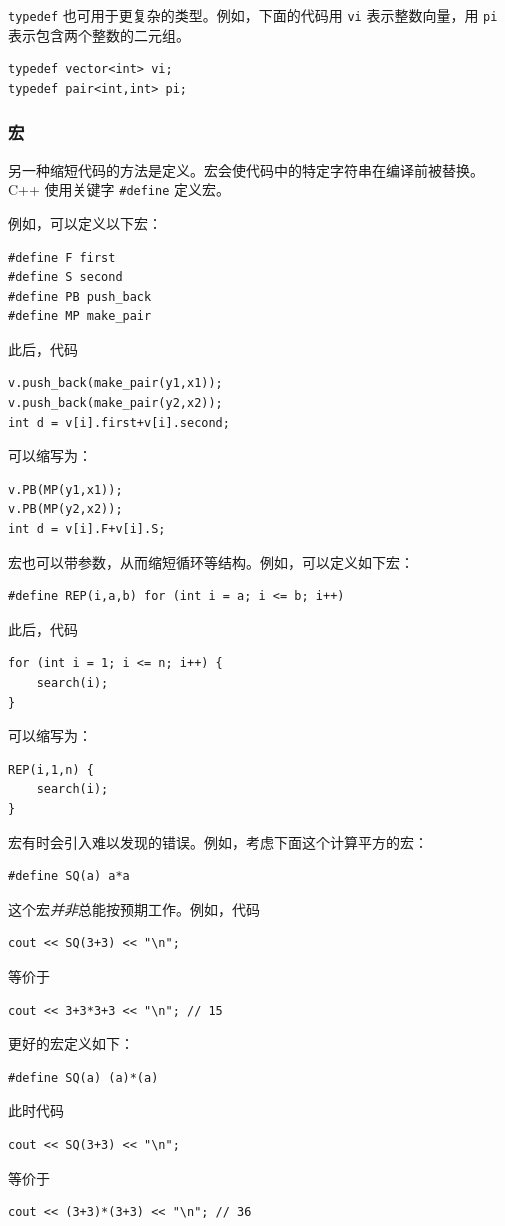 \texttt{typedef} 也可用于更复杂的类型。例如，下面的代码用 \texttt{vi} 表示整数向量，用 \texttt{pi} 表示包含两个整数的二元组。
\begin{lstlisting}
typedef vector<int> vi;
typedef pair<int,int> pi;
\end{lstlisting}

\subsubsection{宏}
另一种缩短代码的方法是定义。宏会使代码中的特定字符串在编译前被替换。C++ 使用关键字 \texttt{\#define} 定义宏。

例如，可以定义以下宏：
\begin{lstlisting}
#define F first
#define S second
#define PB push_back
#define MP make_pair
\end{lstlisting}
此后，代码
\begin{lstlisting}
v.push_back(make_pair(y1,x1));
v.push_back(make_pair(y2,x2));
int d = v[i].first+v[i].second;
\end{lstlisting}
可以缩写为：
\begin{lstlisting}
v.PB(MP(y1,x1));
v.PB(MP(y2,x2));
int d = v[i].F+v[i].S;
\end{lstlisting}

宏也可以带参数，从而缩短循环等结构。例如，可以定义如下宏：
\begin{lstlisting}
#define REP(i,a,b) for (int i = a; i <= b; i++)
\end{lstlisting}
此后，代码
\begin{lstlisting}
for (int i = 1; i <= n; i++) {
    search(i);
}
\end{lstlisting}
可以缩写为：
\begin{lstlisting}
REP(i,1,n) {
    search(i);
}
\end{lstlisting}

宏有时会引入难以发现的错误。例如，考虑下面这个计算平方的宏：
\begin{lstlisting}
#define SQ(a) a*a
\end{lstlisting}
这个宏\emph{并非}总能按预期工作。例如，代码
\begin{lstlisting}
cout << SQ(3+3) << "\n";
\end{lstlisting}
等价于
\begin{lstlisting}
cout << 3+3*3+3 << "\n"; // 15
\end{lstlisting}

更好的宏定义如下：
\begin{lstlisting}
#define SQ(a) (a)*(a)
\end{lstlisting}
此时代码
\begin{lstlisting}
cout << SQ(3+3) << "\n";
\end{lstlisting}
等价于
\begin{lstlisting}
cout << (3+3)*(3+3) << "\n"; // 36
\end{lstlisting}



